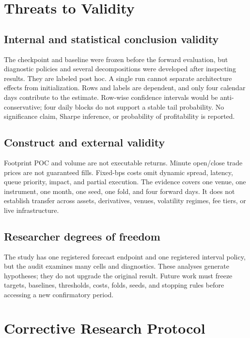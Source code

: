 \documentclass[10pt,letterpaper]{article}
\numberwithin{equation}{section}
\theoremstyle{definition}
\theoremstyle{remark}
\begin{document}
\section{Threats to Validity}

\subsection{Internal and statistical conclusion validity}

The checkpoint and baseline were frozen before the forward evaluation, but
diagnostic policies and several decompositions were developed after inspecting
results. They are labeled post hoc. A single run cannot separate architecture
effects from initialization. Rows and labels are dependent, and only four
calendar days contribute to the estimate. Row-wise confidence intervals would
be anti-conservative; four daily blocks do not support a stable tail
probability. No significance claim, Sharpe inference, or probability of
profitability is reported.

\subsection{Construct and external validity}

Footprint POC and volume are not executable returns. Minute open/close trade
prices are not guaranteed fills. Fixed-bps costs omit dynamic spread, latency,
queue priority, impact, and partial execution. The evidence covers one venue,
one instrument, one month, one seed, one fold, and four forward days. It does
not establish transfer across assets, derivatives, venues, volatility regimes,
fee tiers, or live infrastructure.

\subsection{Researcher degrees of freedom}

The study has one registered forecast endpoint and one registered interval
policy, but the audit examines many cells and diagnostics. These analyses
generate hypotheses; they do not upgrade the original result. Future work must
freeze targets, baselines, thresholds, costs, folds, seeds, and stopping rules
before accessing a new confirmatory period.

\section{Corrective Research Protocol}
\end{document}
